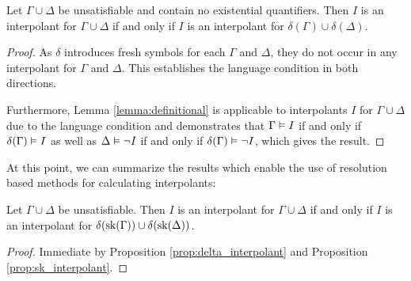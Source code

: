 \begin{prop}
	\label{prop:delta_interpolant}
	Let $\Gamma \cup \Delta$ be unsatisfiable and contain no existential quantifiers.
	Then $I$ is an interpolant for \mbox{$\Gamma \cup \Delta$} if and only if 
	$I$ is an interpolant for $\delta(\Gamma) \cup \delta(\Delta)$.
\end{prop}
\begin{proof}
	As $\delta$ introduces fresh symbols for each $\Gamma$ and $\Delta$, they do not occur in any interpolant for $\Gamma$ and $\Delta$. 
	This establishes the language condition in both directions.

	Furthermore, Lemma \ref{lemma:definitional} is applicable to interpolants $I$ for $\Gamma \cup \Delta$ due to the language condition and demonstrates that
	$\Gamma \vDash I$ if and only if $\delta(\Gamma) \vDash I$
	as well as
	$\Delta \vDash \lnot I$ if and only if $\delta(\Gamma) \vDash \lnot I$, which gives the result.
\end{proof}

At this point, we can summarize the results which enable the use of resolution based methods for calculating interpolants: 

\begin{thm}
	Let $\Gamma \cup \Delta$ be unsatisfiable.
	Then $I$ is an interpolant for \mbox{$\Gamma \cup \Delta$} if and only if 
	$I$ is an interpolant for $\delta(\operatorname{sk}(\Gamma)) \cup \delta(\operatorname{sk}(\Delta))$.
\end{thm}
\begin{proof}
	Immediate by Proposition \ref{prop:delta_interpolant} and Proposition \ref{prop:sk_interpolant}.
\end{proof}

